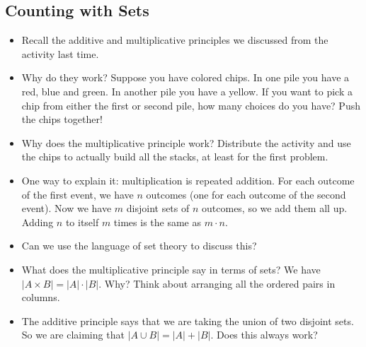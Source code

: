 \documentclass[12pt]{article}
\theoremstyle{plain}
\theoremstyle{definition}
\theoremstyle{remark}
\begin{document}
 \subsection*{Counting with Sets}
 \begin{itemize}
 	\item Recall the additive and multiplicative principles we discussed from the activity last time.
   \item Why do they work?  Suppose you have colored chips.  In one pile you have a red, blue and green.  In another pile you have a yellow.  If you want to pick a chip from either the first or second pile, how many choices do you have?  Push the chips together!
   \item Why does the multiplicative principle work?  Distribute the activity and use the chips to actually build all the stacks, at least for the first problem.
   \item One way to explain it: multiplication is repeated addition.  For each outcome of the first event, we have $n$ outcomes (one for each outcome of the second event).  Now we have $m$ disjoint sets of $n$ outcomes, so we add them all up.  Adding $n$ to itself $m$ times is the same as $m \cdot n$.
\item Can we use the language of set theory to discuss this?
\item What does the multiplicative principle say in terms of sets?  We have $|A \times B| = |A|\cdot |B|$.  Why?  Think about arranging all the ordered pairs in columns.
\item The additive principle says that we are taking the union of two disjoint sets.  So we are claiming that $|A \cup B| = |A| + |B|$.  Does this always work?


\end{itemize}
\end{document}
